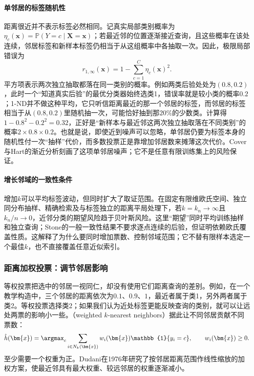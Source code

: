 \paragraph{单邻居的标签随机性}
距离很近并不表示标签必然相同。记真实局部类别概率为$\eta_c(\bm x)=\mathbb P(Y=c\mid\bm X=\bm x)$；若最近邻的位置逐渐接近查询，且这些概率在该处连续，邻居标签和新样本标签仍相当于从这组概率中各抽取一次。因此，极限局部错误为
\[
  r_{1,\infty}(\bm x)=1-\sum_{c=1}^C\eta_c(\bm x)^2.
\]
平方项表示两次独立抽取都落在同一类别的概率。例如两类后验处处为$(0.8,0.2)$，此时一个“知道真实后验”的最优分类器始终选类1，错误率就是较小类的概率$0.2$；1-ND并不做这种平均，它只听信距离最近的那一个邻居的标签，而邻居的标签相当于从$(0.8,0.2)$里随机抽一次，可能恰好抽到那$20\%$的少数类。计算得$1-0.8^2-0.2^2=0.32$，正好是“新样本与最近邻这两次独立抽取落在不同类别”的概率$2\times0.8\times0.2$。也就是说，即使近到噪声可以忽略，单邻居仍要为标签本身的随机性付一次“抽样”代价，而多数投票正是靠增加邻居数来摊薄这次代价。Cover与Hart的渐近分析刻画了这项单邻居噪声；它不是任意有限训练集上的风险保证。

\paragraph{增长邻域的一致性条件}
增加$k$可以平均标签波动，但同时扩大了取证范围。在固定有限维欧氏空间、独立同分布抽样、精确检索及与标签独立的距离平局处理下，若$k=k_n\to\infty$且$k_n/n\to0$，近邻分类的期望风险趋于贝叶斯风险。这里“期望”同时平均训练抽样和独立查询；Stone的一般一致性结果不要求逐点连续的后验，但证明依赖欧氏覆盖性质。这解释了为什么要同时增加票数、控制邻域范围；它不替有限样本选定一个最佳$k$，也不直接覆盖任意近似索引。

\subsubsection{距离加权投票：调节邻居影响}
\label{sec:classification-knn-weighted}

等权投票把选中的邻居一视同仁，却没有使用它们距离查询的差别。例如，在一个教学构造中，三个邻居的距离依次为$0.1$、$0.9$、$1$，最近者属于类1，另外两者属于类2。等权投票选择类2；如果我们认为近处标签更能反映查询的类别，就可以让远处两票的影响小一些。（weighted $k$-nearest neighbors）据此让不同邻居贡献不同票数：
\begin{equation}
  \hat h(\bm{x})=\argmax_c
  \sum_{i\in N_k(\bm{x})}
  w_i(\bm{x})\mathbb{1}\{y_i=c\},
  \qquad w_i(\bm{x})\geq0.
  \label{eq:classification-weighted-knn}
\end{equation}
至少需要一个权重为正。Dudani在1976年研究了按邻居距离范围作线性缩放的加权方案，使最近邻具有最大权重、较远邻居的权重逐渐减小。

